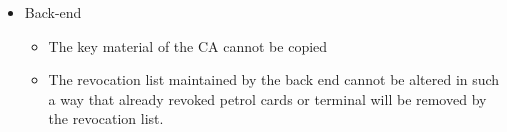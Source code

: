 \begin{itemize}
\item Back-end
\begin{itemize}
\item The key material of the CA cannot be copied
\item The revocation list maintained by the back end cannot be altered in such a way that already revoked petrol cards or terminal will be removed by the revocation list. 
\end{itemize}
\end{itemize}

 
